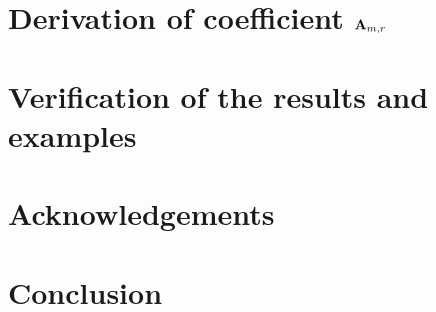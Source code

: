 \documentclass[12pt,letterpaper,oneside,reqno]{amsart}
\newcommand \coeffA [3][A] {{\mathbf{#1}} \sb{#2,#3}}
\numberwithin{equation}{section}
\begin{document}
    \section{Derivation of coefficient \texorpdfstring{$\coeffA{m}{r}$}{A[m,r]}}
    \label{sec:derivation-of-coefficients-a}
    


    \section{Verification of the results and examples}
    \label{sec:verification-of-the-results-and-examples}
    


    \section{Acknowledgements}
    \label{sec:acknowledgements}
    


    \section{Conclusion}
    \label{sec:conclusion}
    

    
    
\end{document}
